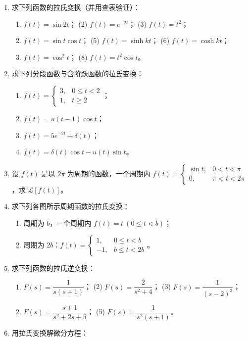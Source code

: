 \begin{enumerate}
\def\labelenumi{\arabic{enumi}.}
\item
  求下列函数的拉氏变换（并用查表验证）：

  \begin{enumerate}
  \def\labelenumii{(\arabic{enumii})}
  \tightlist
  \item
    \(f(t)=\sin2t\)； (2) \(f(t)=e^{-2t}\)； (3) \(f(t)=t^2\)；
  \item
    \(f(t)=\sin t\cos t\)； (5) \(f(t)=\sinh kt\)； (6)
    \(f(t)=\cosh kt\)；
  \item
    \(f(t)=\cos^2 t\)； (8) \(f(t)=t^2\cos t\)。
  \end{enumerate}
\item
  求下列分段函数与含阶跃函数的拉氏变换：

  \begin{enumerate}
  \def\labelenumii{(\arabic{enumii})}
  \tightlist
  \item
    \(f(t)=\begin{cases}3,&0\le t<2\\1,&t\ge2\end{cases}\)；
  \item
    \(f(t)=u(t-1)\cos t\)；
  \item
    \(f(t)=5e^{-2t}+\delta(t)\)；
  \item
    \(f(t)=\delta(t)\cos t-u(t)\sin t\)。
  \end{enumerate}
\item
  设 \(f(t)\) 是以 \(2\pi\) 为周期的函数，一个周期内
  \(f(t)=\begin{cases}\sin t,&0<t<\pi\\0,&\pi<t<2\pi\end{cases}\)，求
  \(\mathcal L[f(t)]\)。
\item
  求下列各图所示周期函数的拉氏变换：

  \begin{enumerate}
  \def\labelenumii{(\arabic{enumii})}
  \tightlist
  \item
    周期为 \(b\)，一个周期内 \(f(t)=t\ (0\le t<b)\)；
  \item
    周期为
    \(2b\)：\(f(t)=\begin{cases}1,&0\le t<b\\-1,&b\le t<2b\end{cases}\)。
  \end{enumerate}
\item
  求下列函数的拉氏逆变换：

  \begin{enumerate}
  \def\labelenumii{(\arabic{enumii})}
  \tightlist
  \item
    \(F(s)=\dfrac{1}{s(s+1)}\)； (2) \(F(s)=\dfrac{2}{s^2+4}\)； (3)
    \(F(s)=\dfrac{1}{(s-2)^3}\)；
  \item
    \(F(s)=\dfrac{s+1}{s^2+2s+5}\)； (5) \(F(s)=\dfrac{1}{s^2(s+1)}\)。
  \end{enumerate}
\item
  用拉氏变换解微分方程：


\end{enumerate}
